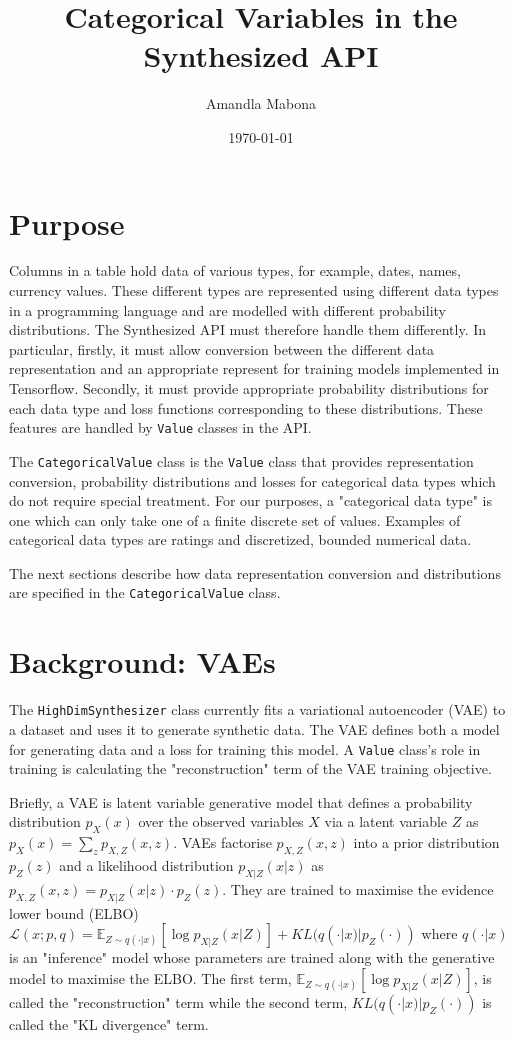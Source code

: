 \documentclass[11pt]{article}
\author{Amandla Mabona}
\date{\today}
\title{Categorical Variables in the Synthesized API}
\begin{document}
\maketitle
\tableofcontents


\section{Purpose}
\label{sec:org099027b}
Columns in a table hold data of various types, for example, dates, names, currency values. These different types are represented using different 
data types in a programming language and are modelled with different probability distributions. The Synthesized API must therefore handle them differently. 
In particular, firstly, it must allow conversion between the different data representation and an appropriate represent for training models implemented in 
Tensorflow. Secondly, it must provide appropriate probability distributions for each data type and loss functions corresponding to these distributions. These 
features are handled by \texttt{Value} classes in the API.

The \texttt{CategoricalValue} class is the \texttt{Value} class that provides representation conversion, probability distributions and losses for categorical data types which do 
not require special treatment. For our purposes, a "categorical data type" is one which can only take one of a finite discrete set of values. Examples of categorical data types are ratings and discretized, bounded numerical data.


The next sections describe how data representation conversion and distributions are specified in the \texttt{CategoricalValue} class.  

\section{Background: VAEs}
\label{sec:orgc5bde54}
The \texttt{HighDimSynthesizer} class currently fits a variational autoencoder (VAE) to a dataset and uses it to generate synthetic data. The VAE defines both a model for generating 
data and a loss for training this model. A \texttt{Value} class's role in training is calculating the "reconstruction" term of the VAE training objective.  

Briefly, a VAE is latent variable generative model that defines a probability distribution \(p_{X}(x)\) over the observed variables \(X\) via a latent variable \(Z\) as \(p_{X}(x)=\sum_{z}p_{X,Z}(x, z)\). VAEs factorise \(p_{X, Z}(x, z)\) into a prior distribution \(p_{Z}(z)\) and a likelihood distribution \(p_{X|Z}(x|z)\) as \(p_{X, Z}(x, z)=p_{X|Z}(x|z)\cdot p_{Z}(z)\). They are trained to maximise the evidence lower bound (ELBO) \(\mathcal{L}(x; p, q) = \mathbb{E}_{Z\sim q(\cdot|x)}[\log p_{X|Z}(x|Z)] + KL(q(\cdot|x)|p_Z(\cdot))\) where \(q(\cdot|x)\) is an "inference" model whose parameters are trained along with the generative model to maximise the ELBO. The first term, \(\mathbb{E}_{Z\sim q(\cdot|x)}[\log p_{X|Z}(x|Z)]\), is called the "reconstruction" term while the second term, \(KL(q(\cdot|x)|p_Z(\cdot))\) is called the "KL divergence" term. 
\end{document}
